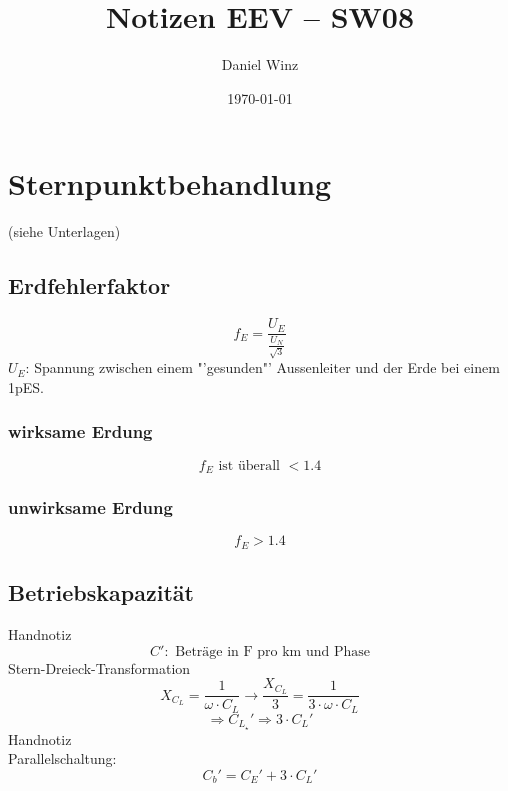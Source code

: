 \documentclass[a4,paper,fleqn]{article}
\title{Notizen EEV -- SW08}
\date{\today}
\author{Daniel Winz}
\begin{document}
\maketitle
\clearpage

\section{Sternpunktbehandlung}
(siehe Unterlagen)

\subsection{Erdfehlerfaktor}
\[ f_E = \frac{U_E}{\frac{U_N}{\sqrt{3}}} \]
$U_E$: Spannung zwischen einem "'gesunden"' Aussenleiter und der Erde bei 
einem 1pES. 
\subsubsection{wirksame Erdung}
\[ f_E \text{ ist überall } < 1.4 \]
\subsubsection{unwirksame Erdung}
\[ f_E > 1.4 \]

\subsection{Betriebskapazität}
Handnotiz
\[ C': \text{ Beträge in F pro km und Phase} \]
Stern-Dreieck-Transformation
\[ X_{C_L} = \frac{1}{\omega \cdot C_L} \rightarrow \frac{X_{C_L}}{3} 
= \frac{1}{3 \cdot \omega \cdot C_L} \]
\[ \Rightarrow {C_{L_\star}}' \Rightarrow 3 \cdot {C_L}' \]
Handnotiz\\
Parallelschaltung: 
\[ \boxed{{C_b}' = {C_E}' + 3 \cdot {C_L}'} \]
\end{document}
